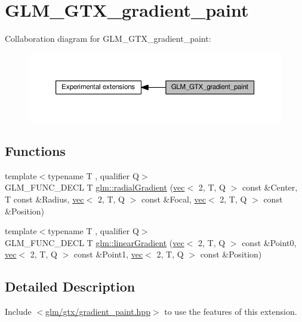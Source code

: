 \hypertarget{group__gtx__gradient__paint}{}\section{G\+L\+M\+\_\+\+G\+T\+X\+\_\+gradient\+\_\+paint}
\label{group__gtx__gradient__paint}
Collaboration diagram for G\+L\+M\+\_\+\+G\+T\+X\+\_\+gradient\+\_\+paint\+:
\nopagebreak
\begin{figure}[H]
\begin{center}
\leavevmode
\includegraphics[width=350pt]{d2/d8d/group__gtx__gradient__paint}
\end{center}
\end{figure}
\subsection*{Functions}
\begin{DoxyCompactItemize}
\item 
{\footnotesize template$<$typename T , qualifier Q$>$ }\\G\+L\+M\+\_\+\+F\+U\+N\+C\+\_\+\+D\+E\+CL T \hyperlink{group__gtx__gradient__paint_gaaecb1e93de4cbe0758b882812d4da294}{glm\+::radial\+Gradient} (\hyperlink{structglm_1_1vec}{vec}$<$ 2, T, Q $>$ const \&Center, T const \&Radius, \hyperlink{structglm_1_1vec}{vec}$<$ 2, T, Q $>$ const \&Focal, \hyperlink{structglm_1_1vec}{vec}$<$ 2, T, Q $>$ const \&Position)
\item 
{\footnotesize template$<$typename T , qualifier Q$>$ }\\G\+L\+M\+\_\+\+F\+U\+N\+C\+\_\+\+D\+E\+CL T \hyperlink{group__gtx__gradient__paint_ga849241df1e55129b8ce9476200307419}{glm\+::linear\+Gradient} (\hyperlink{structglm_1_1vec}{vec}$<$ 2, T, Q $>$ const \&Point0, \hyperlink{structglm_1_1vec}{vec}$<$ 2, T, Q $>$ const \&Point1, \hyperlink{structglm_1_1vec}{vec}$<$ 2, T, Q $>$ const \&Position)
\end{DoxyCompactItemize}


\subsection{Detailed Description}
Include $<$\hyperlink{gradient__paint_8hpp}{glm/gtx/gradient\+\_\+paint.\+hpp}$>$ to use the features of this extension.


